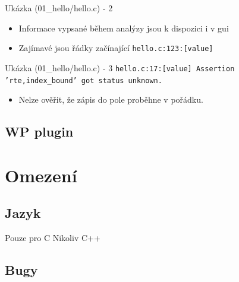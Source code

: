 \documentclass[11pt]{beamer}
\begin{document}


\begin{frame}{Ukázka (01\_hello/hello.c) - 2}
	\lstFirstValueAnalysis
	\begin{itemize}
			\item Informace vypsané během analýzy jsou k dispozici i v gui
			\item Zajímavé jsou řádky začínající \texttt{hello.c:123:[value]}
	\end{itemize}
\end{frame}

\begin{frame}{Ukázka (01\_hello/hello.c) - 3}
\texttt{hello.c:17:[value] Assertion 'rte,index\_bound' got status unknown.}
	\begin{itemize}
			\item Nelze ověřit, že zápis do pole proběhne v pořádku.
	\end{itemize}
\end{frame}

\subsection{WP plugin}

\section{Omezení}
\subsection{Jazyk}
\begin{frame}{Pouze pro C}
Nikoliv C++
\end{frame}
\subsection{Bugy}
\end{document}
